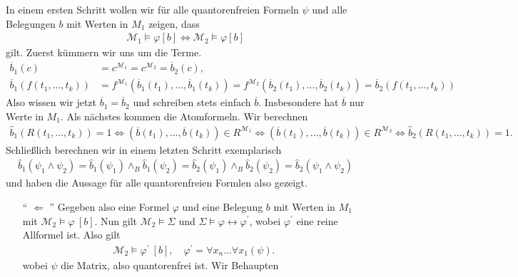 \begin{solution}
	In einem ersten Schritt wollen wir für alle quantorenfreien Formeln $\psi$ und alle Belegungen $b$ mit Werten in $M_1$ zeigen, dass 
	\begin{align*}
	\mathscr{M}_1 \vDash \varphi[b] \iff \mathscr{M}_2 \vDash \varphi[b]
	\end{align*}
	gilt. Zuerst kümmern wir uns um die Terme.
	\begin{align*}
	\overline{b}_1(c) &= c^{\mathscr{M}_1} = c^{\mathscr{M}_2} = \overline{b}_2(c), \\
	\overline{b}_1(f(t_1, \dots, t_k)) &= f^{\mathscr{M}_1}(\overline{b}_1(t_1), \dots, \overline{b}_1(t_k)) = f^{\mathscr{M}_2}(\overline{b}_2(t_1), \dots, \overline{b}_2(t_k)) = \overline{b}_2(f(t_1, \dots, t_k))
	\end{align*}
	Also wissen wir jetzt $\overline{b}_1 = \overline{b}_2$ und schreiben stets einfach $\overline{b}$. Insbesondere hat $\overline{b}$ nur Werte in $M_1$. Als nächstes kommen die Atomformeln. Wir berechnen
	\begin{align*}
	\widehat{b}_1(R(t_1, \dots, t_k)) = 1 \Leftrightarrow (\overline{b}(t_1), \dots, \overline{b}(t_k)) \in R^{\mathscr{M}_1} \Leftrightarrow  (\overline{b}(t_1), \dots, \overline{b}(t_k)) \in R^{\mathscr{M}_2} \Leftrightarrow \widehat{b}_2(R(t_1, \dots, t_k)) = 1.
	\end{align*}
	Schließlich berechnen wir in einem letzten Schritt exemplarisch 
	\begin{align*}
	\widehat{b}_1(\psi_1 \land \psi_2) = \widehat{b}_1(\psi_1) \land_B \widehat{b}_1 (\psi_2) = \widehat{b}_2(\psi_1) \land_B \widehat{b}_2(\psi_2) = \widehat{b}_2(\psi_1 \land \psi_2)
	\end{align*}
	und haben die Aussage für alle quantorenfreien Formlen also gezeigt.
	\begin{enumerate}
		\item[`` $\Leftarrow$ ''] Gegeben also eine Formel $\varphi$ und eine Belegung $b$ mit Werten in $M_1$ mit $\mathscr{M}_2 \vDash \varphi \ [b]$. Nun gilt $\mathscr{M}_2 \vDash \Sigma$ und $\Sigma \vDash \varphi \leftrightarrow \varphi^\prime$, wobei $\varphi^\prime$ eine reine Allformel ist. Also gilt 
		\begin{align*}
		\mathscr{M}_2 \vDash \varphi^\prime \ [b], \quad \varphi^\prime = \forall x_n \dots \forall x_1(\psi).
		\end{align*}
		wobei $\psi$ die Matrix, also quantorenfrei ist. Wir Behaupten
		\begin{align*}

\end{align*}
\end{enumerate}
\end{solution}
